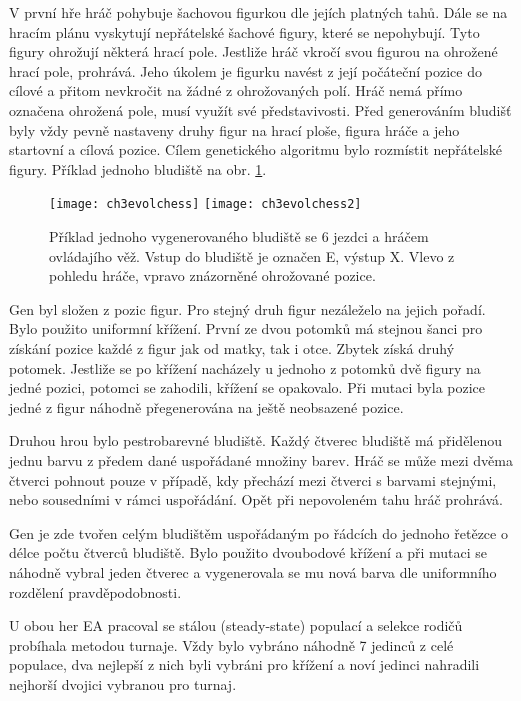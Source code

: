 V první hře hráč pohybuje šachovou figurkou dle jejích platných tahů. Dále se na hracím plánu vyskytují nepřátelské šachové figury, které se nepohybují. Tyto figury ohrožují některá hrací pole. Jestliže hráč vkročí svou figurou na ohrožené hrací pole, prohrává. Jeho úkolem je figurku navést z její počáteční pozice do cílové a přitom nevkročit na žádné z ohrožovaných polí. Hráč nemá přímo označena ohrožená pole, musí využít své představivosti. Před generováním bludišť byly vždy pevně nastaveny druhy figur na hrací ploše, figura hráče a jeho startovní a cílová pozice. Cílem genetického algoritmu bylo rozmístit nepřátelské figury. Příklad jednoho bludiště na obr. \ref{fig-ch3evolchess}.

\begin{figure}
  \centering
  \texttt{[image: ch3evolchess]}
	\texttt{[image: ch3evolchess2]}
	\caption{Příklad jednoho vygenerovaného bludiště se 6 jezdci a hráčem ovládajího věž. Vstup do bludiště je označen E, výstup X. Vlevo z pohledu hráče, vpravo znázorněné ohrožované pozice. \cite{17Evol} }
	\label{fig-ch3evolchess}
\end{figure}

Gen byl složen z pozic figur. Pro stejný druh figur nezáleželo na jejich pořadí. Bylo použito uniformní křížení. První ze dvou potomků má stejnou šanci pro získání pozice každé z figur jak od matky, tak i otce. Zbytek získá druhý potomek. Jestliže se po křížení nacházely u jednoho z potomků dvě figury na jedné pozici, potomci se zahodili, křížení se opakovalo. Při mutaci byla pozice jedné z figur náhodně přegenerována na ještě neobsazené pozice.

Druhou hrou bylo pestrobarevné bludiště. Každý čtverec bludiště má přidělenou jednu barvu z předem dané uspořádané množiny barev. Hráč se může mezi dvěma čtverci pohnout pouze v případě, kdy přechází mezi čtverci s barvami stejnými, nebo sousedními v rámci uspořádání. Opět při nepovoleném tahu hráč prohrává.

Gen je zde tvořen celým bludištěm uspořádaným po řádcích do jednoho řetězce o délce počtu čtverců bludiště. Bylo použito dvoubodové křížení a při mutaci se náhodně vybral jeden čtverec a vygenerovala se mu nová barva dle uniformního rozdělení pravděpodobnosti.

U obou her EA pracoval se stálou (steady-state) populací a selekce rodičů probíhala metodou turnaje. Vždy bylo vybráno náhodně 7 jedinců z celé populace, dva nejlepší z nich byli vybráni pro křížení a noví jedinci nahradili nejhorší dvojici vybranou pro turnaj.

